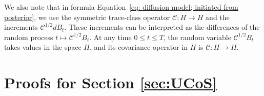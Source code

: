 \documentclass[10pt]{article} %
\def\Eqref#1{Equation~\ref{#1}}
\theoremstyle{plain}
\theoremstyle{definition}
\theoremstyle{remark}
\newcommand{\norm}[1]{\left\|#1\right\|}
\newcommand{\C}{\mathcal C}
\begin{document}
We also note that in formula \Eqref{eq: diffusion model; initiated from posterior}, we use the symmetric trace-class operator $\mathcal{C}\colon H \to H$ and the increments $\mathcal{C}^{1/2} dB_t$. These increments can be interpreted as the differences of the random process $t \mapsto \mathcal{C}^{1/2} B_t$. At any time $0 \le t \le T$, the random variable $\mathcal{C}^{1/2} B_t$ takes values in the space $H$, and its covariance operator in $H$ is $\mathcal{C}\colon H \to H$.


\section{Proofs for Section \ref{sec:UCoS}}

\end{document}
